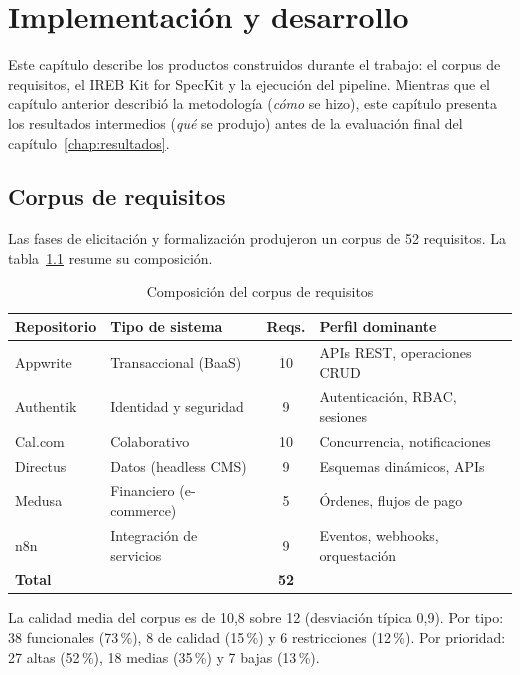 \chapter{Implementaci\'on y desarrollo}
\label{chap:implementacion}

Este cap\'itulo describe los productos construidos durante el trabajo: el corpus de requisitos, el IREB Kit for SpecKit y la ejecuci\'on del pipeline. Mientras que el cap\'itulo anterior describi\'o la metodolog\'ia (\emph{c\'omo} se hizo), este cap\'itulo presenta los resultados intermedios (\emph{qu\'e} se produjo) antes de la evaluaci\'on final del cap\'itulo~\ref{chap:resultados}.

\section{Corpus de requisitos}

Las fases de elicitaci\'on y formalizaci\'on produjeron un corpus de 52 requisitos. La tabla~\ref{tab:corpus} resume su composici\'on.

\begin{table}[htbp]
\centering
\caption{Composici\'on del corpus de requisitos}
\label{tab:corpus}
\begin{tabular}{lp{2.5cm}cp{4cm}}
\toprule
\textbf{Repositorio} & \textbf{Tipo de sistema} & \textbf{Reqs.} & \textbf{Perfil dominante} \\
\midrule
Appwrite & Transaccional (BaaS) & 10 & APIs REST, operaciones CRUD \\
Authentik & Identidad y seguridad & 9 & Autenticaci\'on, RBAC, sesiones \\
Cal.com & Colaborativo & 10 & Concurrencia, notificaciones \\
Directus & Datos (headless CMS) & 9 & Esquemas din\'amicos, APIs \\
Medusa & Financiero (e-commerce) & 5 & \'Ordenes, flujos de pago \\
n8n & Integraci\'on de servicios & 9 & Eventos, webhooks, orquestaci\'on \\
\midrule
\textbf{Total} & & \textbf{52} & \\
\bottomrule
\end{tabular}
\end{table}

La calidad media del corpus es de 10{,}8 sobre 12 (desviaci\'on t\'ipica 0{,}9). Por tipo: 38 funcionales (73\,\%), 8 de calidad (15\,\%) y 6 restricciones (12\,\%). Por prioridad: 27 altas (52\,\%), 18 medias (35\,\%) y 7 bajas (13\,\%).


